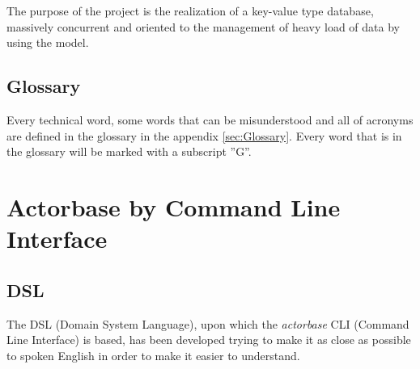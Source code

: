 \documentclass{scalatekids-article}
\begin{document}
The purpose of the project is the realization of a key-value type
 database,
massively concurrent and oriented to the management of heavy load of data by
using the  model.

\subsection{Glossary}
Every technical word, some words that can be misunderstood and all of acronyms are defined in the glossary in the appendix \ref{sec:Glossary}.
Every word that is in the glossary will be marked with a subscript ”G”.







\section{Actorbase by Command Line Interface}

\subsection{DSL}

The DSL (Domain System Language), upon which the \textit{actorbase} CLI (Command
Line Interface) is based, has been developed trying to make it as close as possible
to spoken English in order to make it easier to understand.
\end{document}
